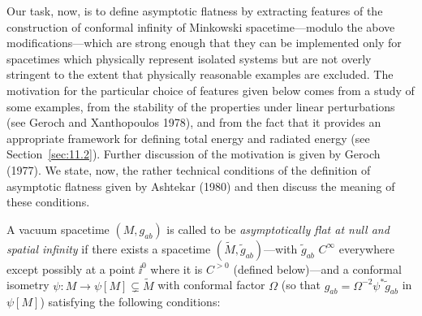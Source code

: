 Our task, now, is to define asymptotic flatness by extracting features of the
construction of conformal infinity of Minkowski spacetime---modulo the above
modifications---which are strong enough that they can be implemented only for
spacetimes which physically represent isolated systems but are not overly stringent
to the extent that physically reasonable examples are excluded. The motivation for
the particular choice of features given below comes from a study of some examples,
from the stability of the properties under linear perturbations (see Geroch and
Xanthopoulos 1978), and from the fact that it provides an appropriate framework for
defining total energy and radiated energy (see Section~\ref{sec:11.2}). Further
discussion of the motivation is given by Geroch (1977). We state, now, the rather
technical conditions of the definition of asymptotic flatness given by Ashtekar (1980)
and then discuss the meaning of these conditions.

A vacuum spacetime \((M,g_{ab})\) is called to be \emph{asymptotically flat at null
and spatial infinity} if there exists a spacetime \((\tilde M,\tilde g_{ab})\)---with
\(\tilde g_{ab}\) \(C^\infty\) everywhere except possibly at a point \(\ii^0\) where it is
\(C^{>0}\) (defined below)---and a conformal isometry
\(\psi:M\to\psi[M]\subsetneq\tilde M\) with conformal factor \(\Omega\) (so that
\(g_{ab}=\Omega^{-2}\psi^*\tilde g_{ab}\) in \(\psi[M]\)) satisfying the following
conditions:

